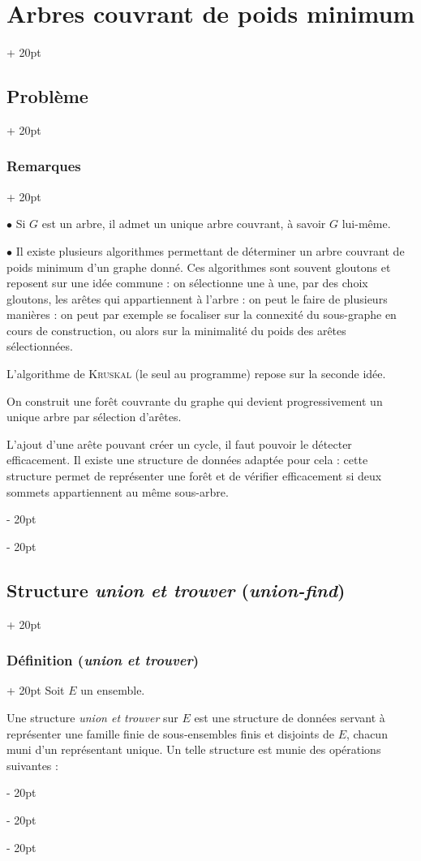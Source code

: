 \documentclass[a4paper, 12pt, twoside]{article}
\newcommand{\ind}[1][20pt]{\advance\leftskip + #1}
\newcommand{\deind}[1][20pt]{\advance\leftskip - #1}
\newenvironment{indt}[2][20pt]{#2 \par \ind[#1]}{\par \deind} %
\begin{document}
\begin{indt}{\section{Arbres couvrant de poids minimum}}
\begin{indt}{\subsection{Problème}}
\begin{indt}{\subsubsection{Remarques}}
                \vspace{12pt}
                
                $\bullet$ Si $G$ est un arbre, il admet un unique arbre couvrant, à savoir $G$ lui-même.

                $\bullet$ Il existe plusieurs algorithmes permettant de déterminer un arbre couvrant de poids minimum d'un graphe donné. Ces algorithmes sont souvent gloutons et reposent sur une idée commune : on sélectionne une à une, par des choix gloutons, les arêtes qui appartiennent à l'arbre :
                on peut le faire de plusieurs manières : on peut par exemple se focaliser sur la connexité du sous-graphe en cours de construction, ou alors sur la minimalité du poids des arêtes sélectionnées.

                L'algorithme de \textsc{Kruskal} (le seul au programme) repose sur la seconde idée.

                On construit une forêt couvrante du graphe qui devient progressivement un unique arbre par sélection d'arêtes.

                L'ajout d'une arête pouvant créer un cycle, il faut pouvoir le détecter efficacement. Il existe une structure de données adaptée pour cela : cette structure permet de représenter une forêt et de vérifier efficacement si deux sommets appartiennent au même sous-arbre.
            \end{indt}
        \end{indt}

        \vspace{12pt}
        
        \begin{indt}{\subsection{Structure \textit{union et trouver} (\textit{union-find})}}
            \begin{indt}{\subsubsection{Définition (\textit{union et trouver})}}
                Soit $E$ un ensemble.

                Une structure \textit{union et trouver} sur $E$ est une structure de données servant à représenter une famille finie de sous-ensembles finis et disjoints de $E$, chacun muni d'un représentant unique.
                Un telle structure est munie des opérations suivantes :


\end{indt}
\end{indt}
\end{indt}
\end{document}
